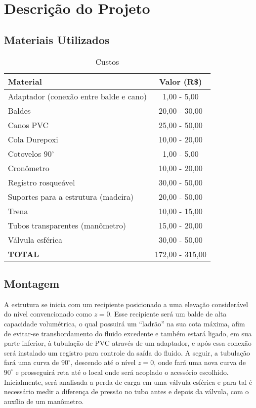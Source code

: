 \chapter{Descrição do Projeto}\label{descricao}

\section{Materiais Utilizados}

 \begin{table}[H]\label{t:custos}
     \centering
     \begin{tabular}{l c }
         \toprule
         \textbf{Material} & \textbf{Valor (R\$)} \\
         \midrule
         Adaptador (conexão entre balde e cano) & 1,00 - 5,00 \\
         Baldes & 20,00 - 30,00 \\
         Canos PVC & 25,00 - 50,00 \\
         Cola Durepoxi & 10,00 - 20,00 \\
         Cotovelos 90$^\circ$ & 1,00 - 5,00\\
         Cronômetro & 10,00 - 20,00 \\
         Registro rosqueável & 30,00 - 50,00 \\
         Suportes para a estrutura (madeira) & 20,00 - 50,00 \\
         Trena & 10,00 - 15,00 \\
         Tubos transparentes (manômetro) & 15,00 - 20,00 \\
         Válvula esférica & 30,00 - 50,00 \\
         \midrule
         \textbf{TOTAL} & 172,00 - 315,00\\
         \bottomrule
     \end{tabular}
     \caption{Custos}
 \end{table}

\section{Montagem}

A estrutura se inicia com um recipiente posicionado a uma elevação 
considerável do nível convencionado como $z = 0$. Esse
recipiente será um balde de alta capacidade volumétrica, o qual possuirá um ``ladrão''
na sua cota máxima, afim de evitar-se transbordamento do fluido excedente e também
estará ligado, em sua parte inferior, 
à tubulação de PVC através de um
adaptador, e após essa conexão será instalado um registro para controle da 
saída do fluido. A seguir, a tubulação fará
uma curva de $90^\circ$, descendo até o nível $z = 0$, 
onde fará uma nova curva de $90^\circ$
e prosseguirá reta até o local onde será
acoplado o acessório escolhido. Inicialmente, será analisada a perda de carga 
em uma válvula esférica e para tal é
necessário medir a diferença de pressão no tubo antes e depois da
válvula, com o auxílio de um manômetro.

